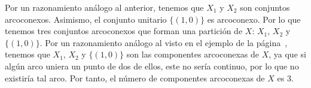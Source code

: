 \begin{ejercicio}
    Por un razonamiento análogo al anterior, tenemos que $X_1$ y $X_2$ son conjuntos arcoconexos. Asimismo, el conjunto unitario $\{(1,0)\}$ es arcoconexo. Por lo que tenemos tres conjuntos arcoconexos que forman una partición de $X$: $X_1$, $X_2$ y $\{(1,0)\}$. Por un razonamiento análogo al visto en el ejemplo de la página~\pageref{ej:conexo_no_arcoconexo}, tenemos que $X_1$, $X_2$ y $\{(1,0)\}$ son las componentes arcoconexas de $X$, ya que si algún arco uniera un punto de dos de ellos, este no sería continuo, por lo que no existiría tal arco. Por tanto, el número de componentes arcoconexas de $X$ es 3.
\end{ejercicio}

